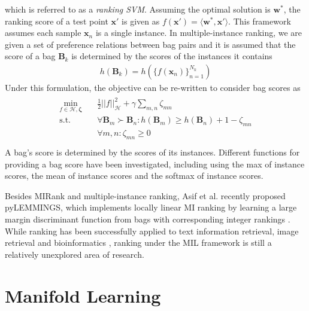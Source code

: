 \noindent
which is referred to as a \textit{ranking SVM}.  Assuming the optimal solution is $\bm{w}^{*}$, the ranking score of a test point $\bm{x}'$ is given as $f(\bm{x}') = \langle \bm{w}^{*}, \bm{x}' \rangle$.  This framework assumes each sample $\bm{x}_{n}$ is a single instance.  In multiple-instance ranking, we are given a set of preference relations between bag pairs and it is assumed that the score of a bag $\bm{B}_{k}$ is determined by the scores of the instances it contains
\begin{align}
	h(\bm{B}_{k}) = h \left( \{ f(\bm{x}_{n})\}_{n=1}^{N_{k}} \right)
\end{align}
\noindent
Under this formulation, the objective can be re-written to consider bag scores as
\begin{align}
\begin{split}
\min_{f\in\mathcal{H},\bm{\zeta}} \quad &\frac{1}{2} ||f ||^{2}_{\mathcal{H}} + \gamma \sum_{m,n} \zeta_{mn} \\
\text{s.t.} \quad &\forall \bm{B}_m \succ \bm{B}_n: h(\bm{B}_{m}) \geq h(\bm{B}_{n}) + 1 -\zeta_{mn}\\
&\forall m,n: \zeta_{mn} \geq 0\\
\end{split}
\end{align}
\noindent
A bag's score is determined by the scores of its instances.  Different functions for providing a bag score have been investigated, including using the max of instance scores, the mean of  instance scores and the softmax of instance scores.

Besides MIRank and multiple-instance ranking, Asif et al. recently proposed pyLEMMINGS, which implements locally linear MI ranking by learning a large margin discriminant function from bags with corresponding integer rankings  \citep{Asif2017LargeMarginMIRanking}.  While ranking has been successfully applied to text information retrieval, image retrieval \citep{Hu2008MIRanking} and bioinformatics \citep{Asif2017LargeMarginMIRanking}, ranking under the MIL framework is still a relatively unexplored area of research.
\section{Manifold Learning}

